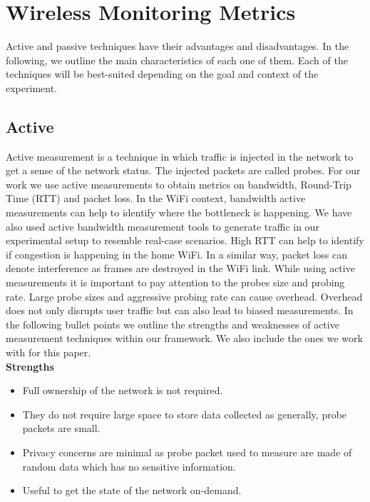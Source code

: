 \section{Wireless Monitoring Metrics}\label{Wireless Monitoring Metrics}

 Active and passive techniques have their advantages and disadvantages. In the following, we outline the main characteristics of each one of them. Each of the techniques will be best-suited depending on the  goal and context of the experiment.

\subsection{Active}

Active measurement is a technique in which traffic is injected in the network to get a sense of the network status. The injected packets are called probes. For our work we use active measurements to obtain metrics on bandwidth, Round-Trip Time (RTT) and packet loss. In the WiFi context, bandwidth active measurements can help to identify where the bottleneck is happening. We have also used active bandwidth measurement tools to generate traffic in our experimental setup to resemble real-case scenarios. High RTT can help to identify if congestion is happening in the home WiFi. In a similar way, packet loss can denote interference as frames are destroyed in the WiFi link. While using active measurements it is  important to pay attention to the probes size and probing rate. Large probe sizes and aggressive probing rate can cause overhead. Overhead does not only disrupts user traffic but can also lead to biased measurements. In the following bullet points we outline the strengths and weaknesses of active measurement techniques within our framework. We also include the ones we work with for this paper.
\\

\textbf{Strengths}
\begin{itemize}
	\item Full ownership of the network is not required.
	\item They do not require large space to store data collected as generally, probe packets are small.
	\item Privacy concerns are minimal as probe packet used to measure are made of random data which has no sensitive information.
	\item Useful to get the state of the network on-demand.
\end{itemize}
	

